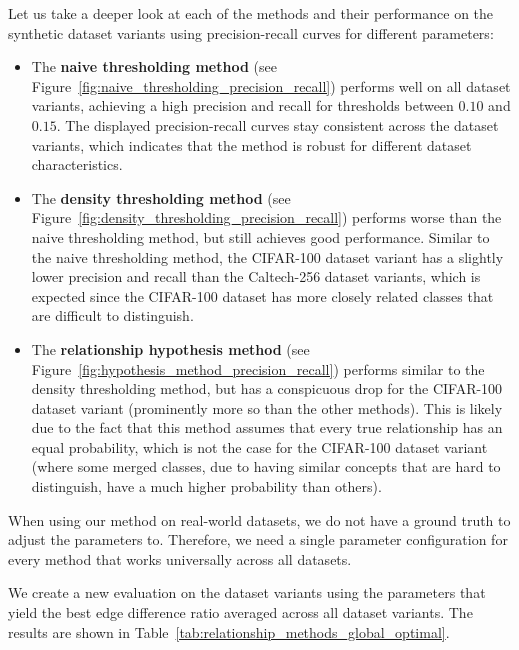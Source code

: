 Let us take a deeper look at each of the methods and their performance
on the synthetic dataset variants using precision-recall curves for different parameters:
\begin{itemize}
      \item The \textbf{naive thresholding method} (see Figure~\ref{fig:naive_thresholding_precision_recall})
            performs well on all dataset variants, achieving a high precision and recall
            for thresholds between $0.10$ and $0.15$.
            The displayed precision-recall curves stay consistent across the dataset variants,
            which indicates that the method is robust for different dataset characteristics.
      \item The \textbf{density thresholding method} (see Figure~\ref{fig:density_thresholding_precision_recall})
            performs worse than the naive thresholding method,
            but still achieves good performance.
            Similar to the naive thresholding method, the CIFAR-100 dataset variant
            has a slightly lower precision and recall than the Caltech-256 dataset variants,
            which is expected since the CIFAR-100 dataset has more closely related classes
            that are difficult to distinguish.
      \item The \textbf{relationship hypothesis method} (see Figure~\ref{fig:hypothesis_method_precision_recall})
            performs similar to the density thresholding method,
            but has a conspicuous drop for the CIFAR-100 dataset variant
            (prominently more so than the other methods).
            This is likely due to the fact that this method assumes that
            every true relationship has an equal probability,
            which is not the case for the CIFAR-100 dataset variant
            (where some merged classes, due to having similar concepts that are hard to distinguish,
            have a much higher probability than others).
\end{itemize}

When using our method on real-world datasets,
we do not have a ground truth to adjust the parameters to.
Therefore, we need a single parameter configuration for every method
that works universally across all datasets.

We create a new evaluation on the dataset variants using the parameters
that yield the best edge difference ratio averaged across all dataset variants.
The results are shown in Table~\ref{tab:relationship_methods_global_optimal}.

